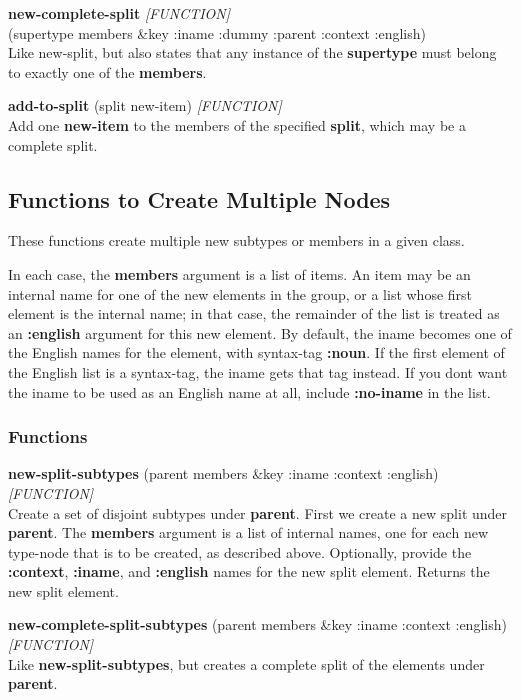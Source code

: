 \documentclass[titlepage,twoside,openright,11pt]{article}
\begin{document}
\textbf{new-complete-split} \emph{{[}FUNCTION{]}\\
}(supertype members \&key :iname :dummy :parent :context :english)\\
Like new-split, but also states that any instance of the
\textbf{supertype} must belong to exactly one of the \textbf{members}.

\textbf{add-to-split} (split new-item) \emph{{[}FUNCTION{]}}\\
Add one \textbf{new-item} to the members of the specified
\textbf{split}, which may be a complete split.

\subsection{Functions to Create Multiple
Nodes}\label{functions-to-create-multiple-nodes}

These functions create multiple new subtypes or members in a given
class.

In each case, the \textbf{members} argument is a list of items. An item
may be an internal name for one of the new elements in the group, or a
list whose first element is the internal name; in that case, the
remainder of the list is treated as an \textbf{:english} argument for
this new element. By default, the iname becomes one of the English names
for the element, with syntax-tag \textbf{:noun}. If the first element of
the English list is a syntax-tag, the iname gets that tag instead. If
you don\textquotesingle t want the iname to be used as an English name
at all, include \textbf{:no-iname} in the list.

\subsubsection{Functions}\label{functions-11}

\textbf{new-split-subtypes} (parent members \&key :iname :context
:english) \emph{{[}FUNCTION{]}}\\
Create a set of disjoint subtypes under \textbf{parent}. First we create
a new split under \textbf{parent}. The \textbf{members} argument is a
list of internal names, one for each new type-node that is to be
created, as described above. Optionally, provide the \textbf{:context},
\textbf{:iname}, and \textbf{:english} names for the new split element.
Returns the new split element.

\textbf{new-complete-split-subtypes} (parent members \&key :iname
:context :english) \emph{{[}FUNCTION{]}}\\
Like \textbf{new-split-subtypes}, but creates a complete split of the
elements under \textbf{parent}.
\end{document}
